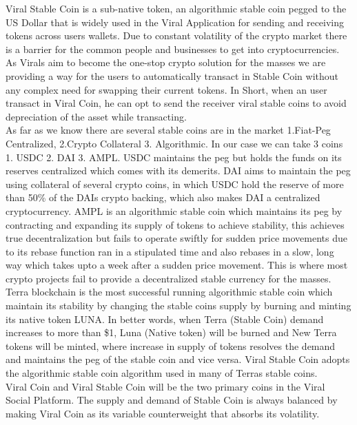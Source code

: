\documentclass[10pt]{article}
\begin{document}
Viral Stable Coin is a sub-native token, an algorithmic stable coin pegged to the US Dollar that is widely used in the Viral Application for sending and receiving tokens across users wallets. Due to constant volatility of the crypto market there is a barrier for the common people and businesses to get into cryptocurrencies. As Viral\textsc{}s aim to become the one-stop crypto solution for the masses we are providing a way for the user\textsc{}s to automatically transact in Stable Coin without any complex need for swapping their current tokens. In Short, when an user transact in Viral Coin, he can opt to send the receiver viral stable coins to avoid depreciation of the asset while transacting.\\

As far as we know there are several stable coins are in the market 1.Fiat-Peg Centralized, 2.Crypto Collateral 3. Algorithmic. In our case we can take 3 coins 1. USDC 2. DAI 3. AMPL. USDC maintains the peg but holds the funds on its reserves centralized which comes with its demerits. DAI aims to maintain the peg using collateral of several crypto coins, in which USDC hold the reserve of more than 50\% of the DAI\textsc{}s crypto backing, which also makes DAI a centralized cryptocurrency. AMPL is an algorithmic stable coin which maintains it\textsc{}s peg by contracting and expanding it\textsc{}s supply of tokens to achieve stability, this achieves true decentralization but fails to operate swiftly for sudden price movements due to it\textsc{}s rebase function ran in a stipulated time and also rebases in a slow, long way which takes upto a week after a sudden price movement. This is where most crypto projects fail to provide a decentralized stable currency for the masses.\\

Terra blockchain is the most successful running algorithmic stable coin which maintain its stability by changing the stable coin\textsc{}s supply by burning and minting it\textsc{}s native token LUNA. In better words, when Terra (Stable Coin) demand increases to more than \$1, Luna (Native token) will be burned and New Terra tokens will be minted, where increase in supply of tokens resolves the demand and maintains the peg of the stable coin and vice versa. Viral Stable Coin adopts the algorithmic stable coin algorithm used in many of Terra\textsc{}s stable coins.\\

Viral Coin and Viral Stable Coin will be the two primary coins in the Viral Social Platform. The supply and demand of Stable Coin is always balanced by making Viral Coin as it\textsc{}s variable counterweight that absorbs it\textsc{}s volatility.\\
\end{document}
